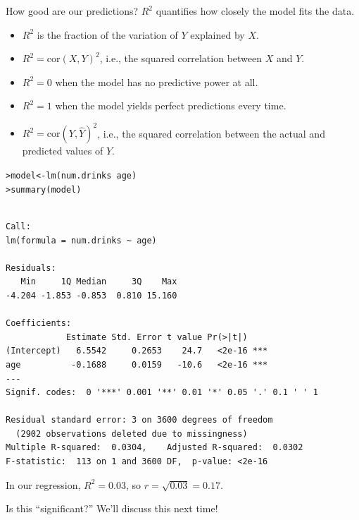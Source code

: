 \documentclass{beamer}\usepackage[]{graphicx}\usepackage[]{color}
\makeatletter
\newcommand{\hlopt}[1]{\textcolor[rgb]{1,0.894,0.769}{#1}}%
\newcommand{\hlstd}[1]{\textcolor[rgb]{1,0.894,0.769}{#1}}%
\newcommand{\hlkwb}[1]{\textcolor[rgb]{0.804,0.776,0.451}{#1}}%
\newcommand{\hlkwd}[1]{\textcolor[rgb]{1,0.78,0.769}{#1}}%
\newenvironment{kframe}{%
 \def\at@end@of@kframe{}%
 \ifinner\ifhmode%
  \def\at@end@of@kframe{\end{minipage}}%
  \begin{minipage}{\columnwidth}%
 \fi\fi%
 \def\FrameCommand##1{\hskip\@totalleftmargin \hskip-\fboxsep
 \colorbox{shadecolor}{##1}\hskip-\fboxsep
     \hskip-\linewidth \hskip-\@totalleftmargin \hskip\columnwidth}%
 \MakeFramed {\advance\hsize-\width
   \@totalleftmargin\z@ \linewidth\hsize
   \@setminipage}}%
 {\par\unskip\endMakeFramed%
 \at@end@of@kframe}
\newenvironment{knitrout}{}{} %
\makeatother
\begin{document}
\begin{darkframes}
    \begin{frame}{How good are our predictions?}
      $R^2$ quantifies how closely the model fits the data.
      \begin{itemize}[<+->]
        \item $R^2$ is the fraction of the variation of $Y$ explained by $X$.
        \item $R^2=\text{cor}(X,Y)^2$, i.e., the squared correlation between $X$ and $Y$.
        \item $R^2=0$ when the model has no predictive power at all.
        \item $R^2=1$ when the model yields perfect predictions every time.
        \item $R^2=\text{cor}(Y,\hat Y)^2$, i.e., the squared correlation between the actual and predicted values of $Y$.
      \end{itemize}
    \end{frame}

    \begin{frame}[fragile]
      \fontsize{9}{9}\selectfont
\begin{knitrout}
\begin{kframe}
\begin{alltt}
\hlstd{> }\hlstd{model} \hlkwb{<-} \hlkwd{lm}\hlstd{(num.drinks} \hlopt{~} \hlstd{age)}
\hlstd{> }\hlkwd{summary}\hlstd{(model)}
\end{alltt}
\begin{verbatim}

Call:
lm(formula = num.drinks ~ age)

Residuals:
   Min     1Q Median     3Q    Max 
-4.204 -1.853 -0.853  0.810 15.160 

Coefficients:
            Estimate Std. Error t value Pr(>|t|)    
(Intercept)   6.5542     0.2653    24.7   <2e-16 ***
age          -0.1688     0.0159   -10.6   <2e-16 ***
---
Signif. codes:  0 '***' 0.001 '**' 0.01 '*' 0.05 '.' 0.1 ' ' 1

Residual standard error: 3 on 3600 degrees of freedom
  (2902 observations deleted due to missingness)
Multiple R-squared:  0.0304,	Adjusted R-squared:  0.0302 
F-statistic:  113 on 1 and 3600 DF,  p-value: <2e-16
\end{verbatim}
\end{kframe}
\end{knitrout}
    \end{frame}

    \begin{frame}
      In our regression, $R^2=0.03$, so $r=\sqrt{0.03}=0.17$.

      Is this ``significant?'' \pause \alert{We'll discuss this next time!}
    \end{frame}
  \end{darkframes}
\end{document}
